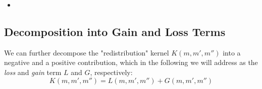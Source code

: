 
    \begin{itemize}
        \item {}
    \end{itemize}





    \clearpage\subsection{Decomposition into Gain and Loss Terms}

        We can further decompose the "redistribution" kernel $K(m,m',m'')$ into a negative and a 
        positive contribution, which in the following we will address as the \textit{loss} and 
        \textit{gain} term $L$ and $G$, respectively:
        \begin{equation}
            K(m,m',m'') = L(m, m', m'') + G(m, m', m'') 
        \end{equation}


